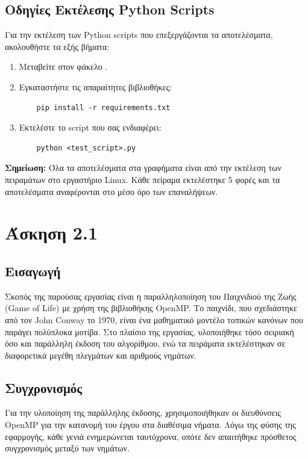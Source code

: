 \documentclass{article}
\begin{document}
\subsection*{Οδηγίες Εκτέλεσης Python Scripts}
Για την εκτέλεση των Python scripts που επεξεργάζονται τα αποτελέσματα, ακολουθήστε τα εξής βήματα:
\begin{enumerate}
    \item Μεταβείτε στον φάκελο .
    \item Εγκαταστήστε τις απαραίτητες βιβλιοθήκες:
    \begin{verbatim}
    pip install -r requirements.txt
    \end{verbatim}
    \item Εκτελέστε το script που σας ενδιαφέρει:
    \begin{verbatim}
    python <test_script>.py
    \end{verbatim}
\end{enumerate}
\textbf{Σημείωση:} Όλα τα αποτελέσματα στα γραφήματα είναι από την εκτέλεση των πειραμάτων στο εργαστήριο Linux. Κάθε πείραμα εκτελέστηκε 5 φορές και τα αποτελέσματα αναφέρονται στο μέσο όρο των επαναλήψεων.
\section*{Άσκηση 2.1}
\subsection*{Εισαγωγή}
Σκοπός της παρούσας εργασίας είναι η παραλληλοποίηση του Παιχνιδιού της Ζωής (Game of Life) με χρήση της βιβλιοθήκης OpenMP. Το παιχνίδι, που σχεδιάστηκε από τον John Conway το 1970, είναι ένα μαθηματικό μοντέλο τοπικών κανόνων που παράγει πολύπλοκα μοτίβα. Στο πλαίσιο της εργασίας, υλοποιήθηκε τόσο σειριακή όσο και παράλληλη έκδοση του αλγορίθμου, ενώ τα πειράματα εκτελέστηκαν σε διαφορετικά μεγέθη πλεγμάτων και αριθμούς νημάτων.
\subsection*{Συγχρονισμός}
Για την υλοποίηση της παράλληλης έκδοσης, χρησιμοποιήθηκαν οι διευθύνσεις OpenMP για την κατανομή του έργου στα διαθέσιμα νήματα. Λόγω της φύσης της εφαρμογής, κάθε γενιά ενημερώνεται ταυτόχρονα, οπότε δεν απαιτήθηκε πρόσθετος συγχρονισμός μεταξύ των νημάτων.
\end{document}
